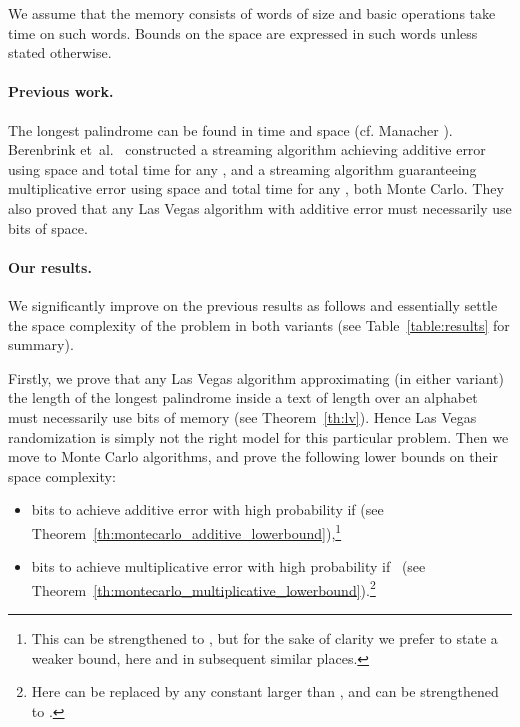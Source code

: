 \documentclass{article}[11pt,letter]
\newcommand{\etal}{et~al.}
\begin{document}
We assume that the memory consists of words of size  and
basic operations take  time on such words. Bounds on the space are expressed in such words unless stated otherwise.

\paragraph{Previous work.} The longest palindrome can be found in  time and space (cf. Manacher \cite{Manacher}).
Berenbrink \etal~\cite{Berenbrink} constructed a streaming algorithm
achieving additive error  using  space and  total time
for any ,
and a streaming algorithm guaranteeing multiplicative error  using 
space and  total time for any ,
both Monte Carlo.
They also proved that any Las Vegas algorithm with additive error  must necessarily use
 bits of space.

\paragraph{Our results.} We significantly improve on the previous results as follows and essentially settle the space complexity of the
problem in both variants (see Table~\ref{table:results} for summary).

Firstly, we prove that any Las Vegas algorithm approximating (in either variant) the length of the longest palindrome inside a text of length 
over an alphabet  must necessarily use  bits of memory (see Theorem~\ref{th:lv}).
Hence Las Vegas randomization is simply not the right model for this particular problem.
Then we move to Monte Carlo algorithms, and prove the following lower bounds on their space complexity:
\begin{itemize}
\item  bits to achieve additive error  with high probability if  (see Theorem~\ref{th:montecarlo_additive_lowerbound}),\footnote{This can be strengthened to , but for the sake of clarity we prefer to state a weaker bound, here and in subsequent similar places.}
\item  bits to achieve multiplicative error  with high probability if \  (see Theorem~\ref{th:montecarlo_multiplicative_lowerbound}).\footnote{Here  can be replaced by any constant larger than , and  can be strengthened to .}
\end{itemize}

\newcommand{\tablebgcolor}{}
\newcommand{\tablebgcolordark}{}
\newcommand{\cellbgcolor}{}
\newcommand{\cellbgcolordark}{}
\end{document}
